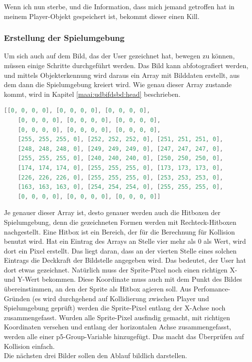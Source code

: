 Wenn ich nun sterbe, und die Information, dass mich jemand getroffen hat in meinem Player-Objekt gespeichert ist, bekommt dieser einen Kill.



\subsubsection{Erstellung der Spielumgebung} \label{impl:Spielumgebung}
Um sich auch auf dem Bild, das der User gezeichnet hat, bewegen zu können, müssen einige Schritte durchgeführt werden. Das Bild kann abfotografiert werden, und mittels Objekterkennung wird daraus ein Array mit Bilddaten erstellt,
aus dem dann die Spielumgebung kreiert wird. Wie genau dieser Array zustande kommt, wird in Kapitel \ref{maai:udbifdsbd:head} beschrieben.
\\
\begin{lstlisting}[caption=Vereinfachte Darstellung eines Bilddaten-Arrays,language=Java,label=lst:impl:bilddaten]
    [[0, 0, 0, 0], [0, 0, 0, 0], [0, 0, 0, 0],
    [0, 0, 0, 0], [0, 0, 0, 0], [0, 0, 0, 0],
    [0, 0, 0, 0], [0, 0, 0, 0], [0, 0, 0, 0],
    [255, 255, 255, 0], [252, 252, 252, 0], [251, 251, 251, 0],
    [248, 248, 248, 0], [249, 249, 249, 0], [247, 247, 247, 0],
    [255, 255, 255, 0], [240, 240, 240, 0], [250, 250, 250, 0],
    [174, 174, 174, 0], [255, 255, 255, 0], [173, 173, 173, 0],
    [226, 226, 226, 0], [255, 255, 255, 0], [253, 253, 253, 0],
    [163, 163, 163, 0], [254, 254, 254, 0], [255, 255, 255, 0],
    [0, 0, 0, 0], [0, 0, 0, 0], [0, 0, 0, 0]]
\end{lstlisting}


Je genauer dieser Array ist, desto genauer werden auch die Hitboxen der Spielumgebung, denn die gezeichneten Formen werden mit Rechteck-Hitboxen nachgestellt.
Eine Hitbox ist ein Bereich, der für die Berechnung für Kollision benutzt wird.
Hat ein Eintrag des Arrays an Stelle vier mehr als 0 als Wert, wird dort ein Pixel erstellt. Das liegt daran, dass an der vierten Stelle eines solchen Eintrags die Deckkraft der Bildstelle angegeben wird. Das bedeutet, der User hat dort etwas gezeichnet.
Natürlich muss der Sprite-Pixel noch einen richtigen X- und Y-Wert bekommen. Diese Koordinate muss auch mit dem Punkt des Bildes übereinstimmen, an den der Sprite als Hitbox agieren soll.
Aus Perfomance-Gründen (es wird durchgehend auf Kollidierung zwischen Player und Spielumgebung geprüft) werden die Sprite-Pixel entlang der X-Achse noch zusammengefasst.
Wurden alle Sprite-Pixel ausfindig gemacht, mit richtigen Koordinaten versehen und entlang der horizontalen Achse zusammengefasst, werden alle einer p5-Group-Variable hinzugefügt.
Das macht das Überprüfen auf Kollision einfach. \\
Die nächsten drei Bilder sollen den Ablauf bildlich darstellen.

